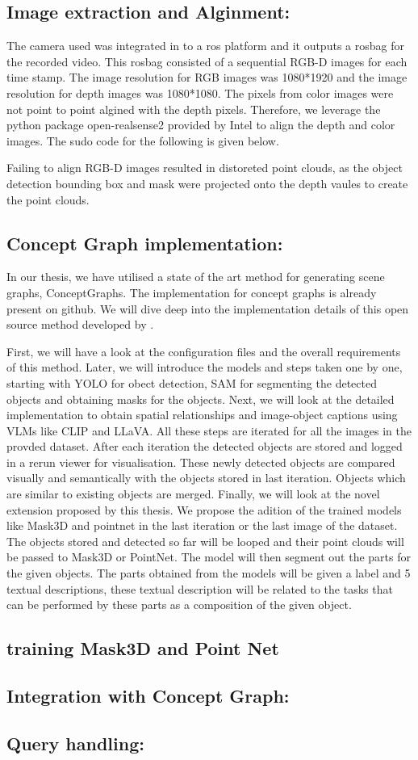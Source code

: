 \subsection{Image extraction and Alginment:}
The camera used was integrated in to a ros platform and it outputs a rosbag for the recorded video. This rosbag consisted of a sequential RGB-D images for each time
stamp. The image resolution for RGB images was 1080*1920 and the image resolution for depth images was 1080*1080. The pixels from color images were not point to point 
algined with the depth pixels. Therefore, we leverage the python package open-realsense2 provided by Intel to align the depth and color images. The sudo code for the 
following is given below. 

Failing to align RGB-D images resulted in distoreted point clouds, as the object detection bounding box and mask were projected onto the depth vaules to create the point clouds.

\subsection{Concept Graph implementation:}
In our thesis, we have utilised a state of the art method for generating scene graphs, ConceptGraphs. The implementation for concept graphs is already present on
github. We will dive deep into the implementation details of this open source method developed by \citet{scenefun3D}.

First, we will have a look at the configuration files and the overall requirements of this method. Later, we will introduce the models and steps taken one by one, starting 
with YOLO for obect detection, SAM for segmenting the detected objects and obtaining masks for the objects. Next, we will look at the detailed implementation to 
obtain spatial relationships and image-object captions using VLMs like CLIP and LLaVA. All these steps are iterated for all the images in the provded dataset. After each iteration 
the detected objects are stored and logged in a rerun viewer for visualisation. These newly detected objects are compared visually and semantically with the 
objects stored in last iteration. Objects which are similar to existing objects are merged. Finally, we will look at the novel extension proposed by this thesis. 
We propose the adition of the trained models like Mask3D and pointnet in the last iteration or the last image of the dataset. The objects stored and detected so far will
be looped and their point clouds will be passed to Mask3D or PointNet. The model will then segment out the parts for the given objects. The parts obtained from
the models will be given a label and 5 textual descriptions, these textual description will be related to the tasks that can be performed by these parts as a composition
of the given object.
\subsection{training Mask3D and Point Net}
\subsection{Integration with Concept Graph:}
\subsection{Query handling:}